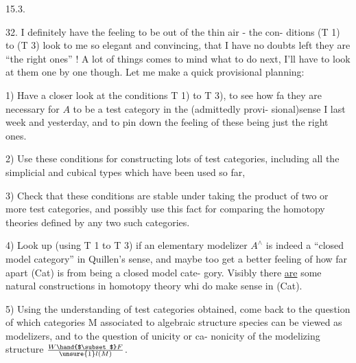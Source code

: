 
15.3.

32.   I definitely have the feeling to be out of the thin air  -  the con-%
ditions  (T 1) to (T 3) look to me so elegant and convincing,  that I have
no doubts left they are ``the right ones'' !  A lot of things comes to mind
what to do next,  I'll have to look at them one by one though. Let me make
a quick provisional planning:

1)  Have a closer look at the conditions  T 1) to  T 3),  to see how fa
they are necessary for  $A$ to be a test category in the (admittedly provi-%
sional)sense\xout{\unsure{;}} I  last week and yesterday,  and to pin down
the feeling of these being just the right ones.

2)  Use these conditions for constructing lots of test categories,
including all the simplicial and cubical types which have been used so far,

3)  Check that these conditions are stable under taking the product of
two or more test categories,  and possibly use this fact for comparing
the homotopy theories defined by any two such categories.

4)  Look up  (using T 1 to T 3) if an elementary  modelizer $A^{\wedge}$
is indeed a ``closed model category'' in Quillen's sense,  and maybe too get
a better feeling of how far apart (Cat) is from being a closed model cate-%
gory. Visibly there \uline{are} some natural constructions in homotopy theory whi
do make sense in (Cat).

5)  Using the understanding of test categories obtained,  come back to
the question of which categories M associated to  algebraic structure
species can be viewed as modelizers,  and to the question of unicity or ca-%
nonicity of the modelizing structure $W\hand{$\subset$}F\over{\unsure{1}}{l}(M)$.


